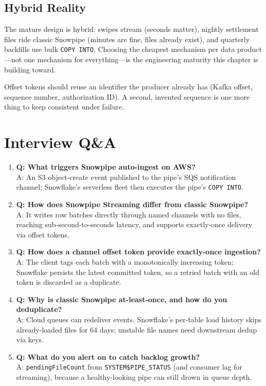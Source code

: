 \subsection{Hybrid Reality}
The mature design is hybrid: swipes stream (seconds matter), nightly settlement files ride classic Snowpipe (minutes are fine, files already exist), and quarterly backfills use bulk \texttt{COPY INTO}. Choosing the cheapest mechanism per data product---not one mechanism for everything---is the engineering maturity this chapter is building toward.

\begin{tipbox}
Offset tokens should reuse an identifier the producer already has (Kafka offset, sequence number, authorization ID). A second, invented sequence is one more thing to keep consistent under failure.
\end{tipbox}

\section{Interview Q\&A}
\begin{enumerate}
    \item \textbf{Q: What triggers Snowpipe auto-ingest on AWS?}\\
    A: An S3 object-create event published to the pipe's SQS notification channel; Snowflake's serverless fleet then executes the pipe's \texttt{COPY INTO}.
    \item \textbf{Q: How does Snowpipe Streaming differ from classic Snowpipe?}\\
    A: It writes row batches directly through named channels with no files, reaching sub-second-to-seconds latency, and supports exactly-once delivery via offset tokens.
    \item \textbf{Q: How does a channel offset token provide exactly-once ingestion?}\\
    A: The client tags each batch with a monotonically increasing token; Snowflake persists the latest committed token, so a retried batch with an old token is discarded as a duplicate.
    \item \textbf{Q: Why is classic Snowpipe at-least-once, and how do you deduplicate?}\\
    A: Cloud queues can redeliver events. Snowflake's per-table load history skips already-loaded files for 64 days; unstable file names need downstream dedup via keys.
    \item \textbf{Q: What do you alert on to catch backlog growth?}\\
    A: \texttt{pendingFileCount} from \texttt{SYSTEM\$PIPE\_STATUS} (and consumer lag for streaming), because a healthy-looking pipe can still drown in queue depth.
\end{enumerate}


